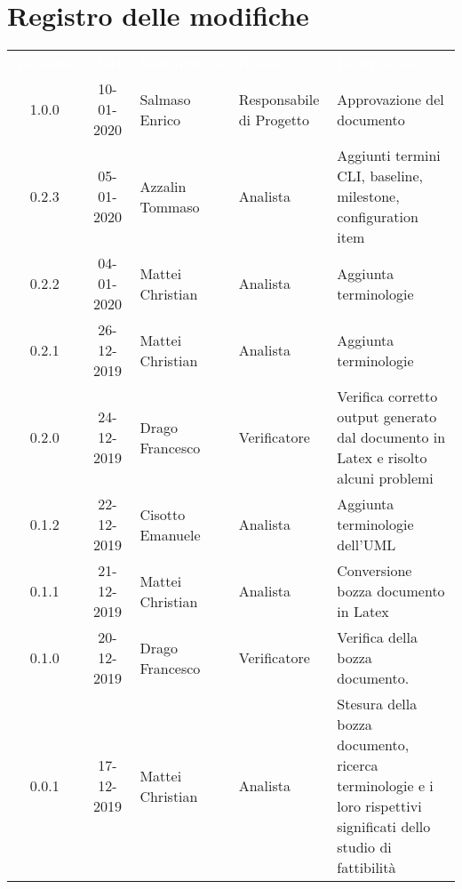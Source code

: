 \section*{Registro delle modifiche}
{
\renewcommand{\arraystretch}{1.5}
\centering
\begin{longtable}{ c c  C{4cm}  C{3cm} C{4cm}}
\textcolor{white}{\textbf{Versione}} & \textcolor{white}{\textbf{Data}} & \textcolor{white}{\textbf{Nominativo}} & \textcolor{white}{\textbf{Ruolo}} & \textcolor{white}{\textbf{Descrizione}}\\	


1.0.0 & 10-01-2020 & Salmaso Enrico & Responsabile di Progetto & Approvazione del documento \\



0.2.3 & 05-01-2020 & Azzalin Tommaso & Analista & Aggiunti termini CLI, baseline, milestone, configuration item \\

0.2.2 & 04-01-2020 & Mattei Christian & Analista & Aggiunta terminologie \\

0.2.1 & 26-12-2019 & Mattei Christian & Analista & Aggiunta terminologie \\

0.2.0 & 24-12-2019 & Drago Francesco & Verificatore & Verifica corretto output generato dal documento in Latex e risolto alcuni problemi\\

0.1.2 & 22-12-2019 & Cisotto Emanuele & Analista & Aggiunta terminologie dell'UML \\

0.1.1 & 21-12-2019 & Mattei Christian & Analista & Conversione bozza documento in Latex\\
		
0.1.0 & 20-12-2019 & Drago Francesco & Verificatore & Verifica della bozza documento.  \\
		
0.0.1 & 17-12-2019 & Mattei Christian & Analista & Stesura della bozza documento, ricerca terminologie e i loro rispettivi significati dello studio di fattibilità \\
		
\end{longtable}
}